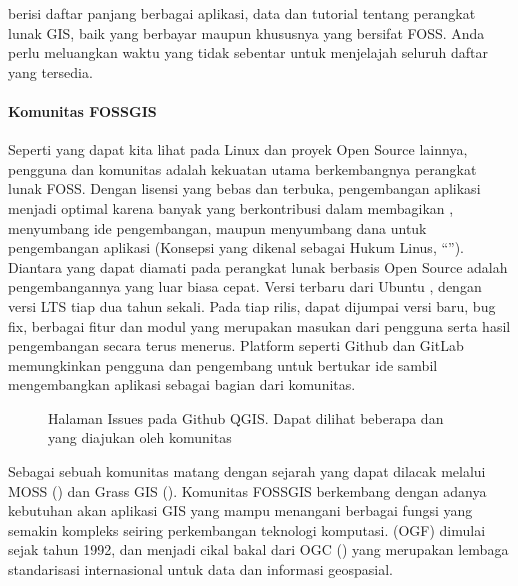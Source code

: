 \documentclass[letterpaper,10pt,english]{sphinxmanual}
\let\sphinxpxdimen\pdfpxdimen\else\newdimen\sphinxpxdimen
\begin{document}
 berisi daftar panjang berbagai aplikasi, data dan tutorial tentang perangkat lunak GIS, baik yang berbayar maupun khususnya yang bersifat FOSS. Anda perlu meluangkan waktu yang tidak sebentar untuk menjelajah seluruh daftar yang tersedia.


\paragraph{Komunitas FOSS\sphinxhyphen{}GIS}
\label{\detokenize{sesi1/fossgis:komunitas-foss-gis}}
Seperti yang dapat kita lihat pada Linux dan proyek Open Source lainnya, pengguna dan komunitas adalah kekuatan utama berkembangnya perangkat lunak FOSS. Dengan lisensi yang bebas dan terbuka, pengembangan aplikasi menjadi optimal karena banyak yang berkontribusi dalam membagikan , menyumbang ide pengembangan, maupun menyumbang dana untuk pengembangan aplikasi (Konsepsi yang dikenal sebagai Hukum Linus, “”). Diantara yang dapat diamati pada perangkat lunak berbasis Open Source adalah pengembangannya yang luar biasa cepat. Versi terbaru dari Ubuntu , dengan versi LTS tiap dua tahun sekali. Pada tiap rilis, dapat dijumpai versi baru, bug fix, berbagai fitur dan modul yang merupakan masukan dari pengguna serta hasil pengembangan secara terus menerus. Platform seperti Github dan GitLab memungkinkan pengguna dan pengembang untuk bertukar ide sambil mengembangkan aplikasi sebagai bagian dari komunitas.

\begin{figure}[htbp]
\centering
\capstart

\noindent\sphinxincludegraphics[height=550\sphinxpxdimen]{{2020-12-07-17-26-53}.png}
\caption{Halaman Issues pada Github QGIS. Dapat dilihat beberapa  dan  yang diajukan oleh komunitas}\label{\detokenize{sesi1/fossgis:qgisissue}}\end{figure}

Sebagai sebuah komunitas matang dengan sejarah yang dapat dilacak  melalui MOSS () dan Grass GIS (). Komunitas FOSS\sphinxhyphen{}GIS berkembang dengan adanya kebutuhan akan aplikasi GIS yang mampu menangani berbagai fungsi yang semakin kompleks seiring perkembangan teknologi komputasi.  (OGF) dimulai sejak tahun 1992, dan menjadi cikal bakal dari OGC () yang merupakan lembaga standarisasi internasional untuk data dan informasi geospasial.
\end{document}
